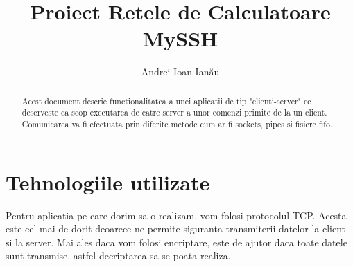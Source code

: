 \documentclass[runningheads]{llncs}
\begin{document}
%
\title{Proiect Retele de Calculatoare\\  MySSH}
%
%
\author{Andrei-Ioan Ianău }

%
%
\maketitle              %
%
\begin{abstract}
Acest document descrie functionalitatea a unei aplicatii de tip "clienti-server" ce deserveste ca scop executarea de catre server a unor comenzi primite de la un client. Comunicarea va fi efectuata prin diferite metode cum ar fi sockets, pipes si fisiere fifo.


\end{abstract}

\section{Tehnologiile utilizate}

Pentru aplicatia pe care dorim sa o realizam, vom folosi protocolul TCP. Acesta este cel mai de dorit deoarece ne permite siguranta transmiterii datelor la client si la server. Mai ales daca vom folosi encriptare, este de ajutor daca toate datele sunt transmise, astfel decriptarea sa se poata realiza.
\end{document}
